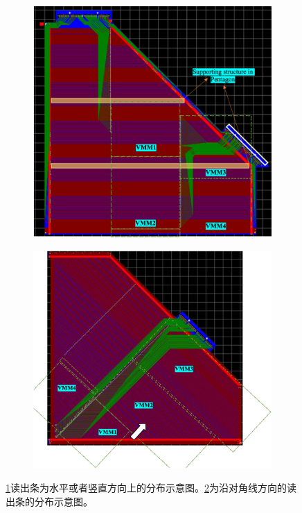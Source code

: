 \begin{figure}[htb]
    \centering
    \begin{subfigure}[b]{0.45\textwidth}
        \centering
        \includegraphics[width=\textwidth,clip]{figures/Chapter3/sTGC_PCB_HV.png}
        \caption{}
        \label{fig:sTGC_PCB_HV}
    \end{subfigure}
    \hfill
    \begin{subfigure}[b]{0.45\textwidth}
        \centering
        \includegraphics[width=\textwidth,clip]{figures/Chapter3/sTGC_PCB_Diag.png}
        \caption{}
        \label{fig:sTGC_PCB_Diag}
    \end{subfigure}
    \caption[五边形构型sTGC模组读出条分布示意图]{\ref{fig:sTGC_PCB_HV}读出条为水平或者竖直方向上的分布示意图。\ref{fig:sTGC_PCB_Diag}为沿对角线方向的读出条的分布示意图。}
       \label{fig:sTGC_PCB}
\end{figure}
